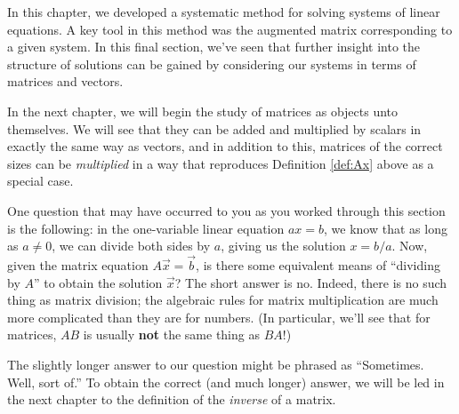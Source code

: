 \medskip

In this chapter, we developed a systematic method for solving systems of linear equations. A key tool in this method was the augmented matrix corresponding to a given system. In this final section, we've seen that further insight into the structure of solutions can be gained by considering our systems in terms of matrices and vectors.

In the next chapter, we will begin the study of matrices as objects unto themselves. We will see that they can be added and multiplied by scalars in exactly the same way as vectors, and in addition to this, matrices of the correct sizes can be \textit{multiplied} in a way that reproduces Definition \ref{def:Ax} above as a special case. 

One question that may have occurred to you as you worked through this section is the following: in the one-variable linear equation $ax=b$, we know that as long as $a\neq 0$, we can divide both sides by $a$, giving us the solution $x=b/a$. Now, given the matrix equation $A\vec{x}=\vec{b}$, is there some equivalent means of ``dividing by $A$'' to obtain the solution $\vec{x}$? The short answer is no. Indeed, there is no such thing as matrix division; the algebraic rules for matrix multiplication are much more complicated than they are for numbers. (In particular, we'll see that for matrices, $AB$ is usually \textbf{not} the same thing as $BA$!) 

The slightly longer answer to our question might be phrased as ``Sometimes. Well, sort of.'' To obtain the correct (and much longer) answer, we will be led in the next chapter to the definition of the \textit{inverse} of a matrix.






